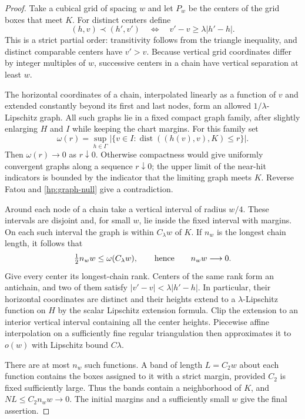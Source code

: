 \documentclass[11pt]{article}
\numberwithin{equation}{section}
\theoremstyle{definition}
\theoremstyle{remark}
\DeclareMathOperator{\dist}{dist}
\begin{document}
\begin{proof}
Take a cubical grid of spacing $w$ and let $P_w$ be the centers of
the grid boxes that meet $K$.  For distinct centers define
\[
 (h,v)\prec(h',v')\quad\Longleftrightarrow\quad
                         v'-v\ge\lambda|h'-h|.
\]
This is a strict partial order: transitivity follows from the
triangle inequality, and distinct comparable centers have $v'>v$.
Because vertical grid coordinates differ by integer multiples of
$w$, successive centers in a chain have vertical separation at least
$w$.

The horizontal coordinates of a chain, interpolated linearly as a
function of $v$ and extended constantly beyond its first and last
nodes, form an allowed $1/\lambda$-Lipschitz graph.  All such graphs
lie in a fixed compact graph family, after slightly enlarging $H$
and $I$ while keeping the chart margins.  For this family set
\[
 \omega(r)=\sup_{h\in\Gamma}
  \bigl|\{v\in I:\dist((h(v),v),K)\le r\}\bigr|.
\]
Then $\omega(r)\to0$ as $r\downarrow0$.  Otherwise compactness
would give uniformly convergent graphs along a sequence $r\downarrow0$;
the upper limit of the near-hit indicators is bounded by the
indicator that the limiting graph meets $K$.  Reverse Fatou and
\eqref{hp:graph-null} give a contradiction.

Around each node of a chain take a vertical interval of radius
$w/4$.  These intervals are disjoint and, for small $w$, lie inside
the fixed interval with margins.  On each such interval the graph
is within $C_\lambda w$ of $K$.  If $n_w$ is the longest chain
length, it follows that
\[
 \tfrac12 n_ww\le\omega(C_\lambda w),
 \qquad\hbox{hence}\qquad n_ww\longrightarrow0.
\]
Give every center its longest-chain rank.  Centers of the same rank
form an antichain, and two of them satisfy
$|v'-v|<\lambda|h'-h|$.  In particular, their horizontal coordinates
are distinct and their heights extend to a $\lambda$-Lipschitz
function on $H$ by the scalar Lipschitz extension formula.  Clip
the extension to an interior vertical interval containing all the
center heights.  Piecewise affine interpolation on a sufficiently
fine regular triangulation then approximates it to $o(w)$ with
Lipschitz bound $C\lambda$.

There are at most $n_w$ such functions.  A band of length $L=C_2w$
about each function contains the boxes assigned to it with a strict
margin, provided $C_2$ is fixed sufficiently large.  Thus the bands
contain a neighborhood of $K$, and
$NL\le C_2n_ww\to0$.  The initial margins and a sufficiently small
$w$ give the final assertion.
\end{proof}
\end{document}

